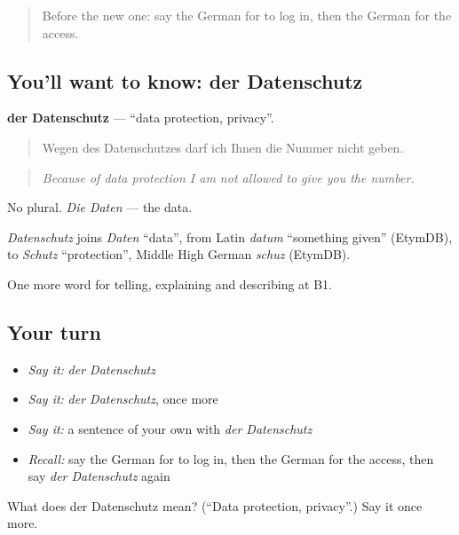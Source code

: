 \begin{quote}
Before the new one: say the German for to log in, then the German for the access.
\end{quote}

\subsection*{You'll want to know: der Datenschutz}
\textbf{der Datenschutz} — \textquotedblleft{}data protection, privacy\textquotedblright{}.

\begin{quote}
Wegen des Datenschutzes darf ich Ihnen die Nummer nicht geben.
\end{quote}

\begin{quote}
\emph{Because of data protection I am not allowed to give you the number.}
\end{quote}

No plural. \emph{Die Daten} — the data.

\begin{cousinweb}
\emph{Datenschutz} joins \emph{Daten} \textquotedblleft{}data\textquotedblright{}, from Latin \emph{datum} \textquotedblleft{}something given\textquotedblright{} (EtymDB), to \emph{Schutz} \textquotedblleft{}protection\textquotedblright{}, Middle High German \emph{schuz} (EtymDB).
\end{cousinweb}

\begin{grammarlens}[title={What you've built}]
One more word for telling, explaining and describing at B1.
\end{grammarlens}

\subsection*{Your turn}
\begin{itemize}
\raggedright
  \item \emph{Say it:} \emph{der Datenschutz}
  \item \emph{Say it:} \emph{der Datenschutz}, once more
  \item \emph{Say it:} a sentence of your own with \emph{der Datenschutz}
  \item \emph{Recall:} say the German for to log in, then the German for the access, then say \emph{der Datenschutz} again
\end{itemize}

\begin{tcolorbox}[breakable,colback=teal!4,colframe=teal!35!black,title={Before you move on}]
What does der Datenschutz mean? (\textquotedblleft{}Data protection, privacy\textquotedblright{}.) Say it once more.
\end{tcolorbox}
